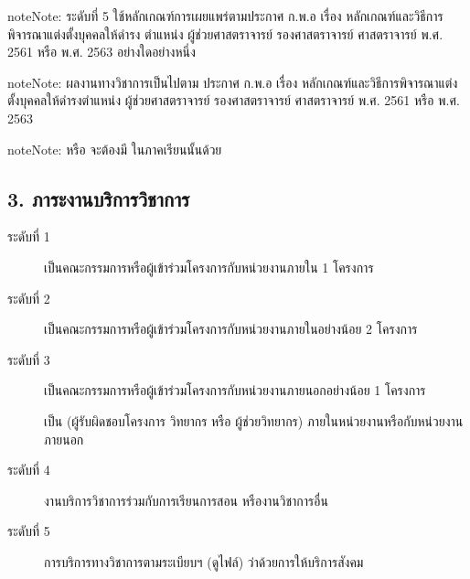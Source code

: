 \documentclass[a4paper,12pt,english]{sphinxmanual}
\begin{document}
\begin{sphinxadmonition}{note}{Note:}
ระดับที่ 5 ใช้หลักเกณฑ์การเผยแพร่ตามประกาศ ก.พ.อ เรื่อง หลักเกณฑ์และวิธีการพิจารณาแต่งตั้งบุคคลให้ดำรง ตำแหน่ง ผู้ช่วยศาสตราจารย์
รองศาสตราจารย์ ศาสตราจารย์ พ.ศ. 2561 หรือ พ.ศ. 2563 อย่างใดอย่างหนึ่ง
\end{sphinxadmonition}

\begin{sphinxadmonition}{note}{Note:}
ผลงานทางวิชาการเป็นไปตาม ประกาศ ก.พ.อ เรื่อง หลักเกณฑ์และวิธีการพิจารณาแต่งตั้งบุคคลให้ดำรงตำแหน่ง ผู้ช่วยศาสตราจารย์ รองศาสตราจารย์ ศาสตราจารย์ พ.ศ. 2561 หรือ พ.ศ. 2563
\end{sphinxadmonition}

\begin{sphinxadmonition}{note}{Note:}
{\hyperref[\detokenize{glossary:term-0}]{}} หรือ {\hyperref[\detokenize{glossary:term-1}]{}} จะต้องมี {\hyperref[\detokenize{glossary:term-7}]{}} ในภาคเรียนนั้นด้วย
\end{sphinxadmonition}


\subsection{3. ภาระงานบริการวิชาการ}
\label{\detokenize{submission_part1:id15}}\begin{description}
\item[{ระดับที่ 1}] \leavevmode
เป็นคณะกรรมการหรือผู้เข้าร่วมโครงการกับหน่วยงานภายใน 1 โครงการ

\item[{ระดับที่ 2}] \leavevmode
เป็นคณะกรรมการหรือผู้เข้าร่วมโครงการกับหน่วยงานภายในอย่างน้อย 2 โครงการ

\item[{ระดับที่ 3}] \leavevmode
เป็นคณะกรรมการหรือผู้เข้าร่วมโครงการกับหน่วยงานภายนอกอย่างน้อย 1 โครงการ

 เป็น {\hyperref[\detokenize{glossary:term-5}]{}} (ผู้รับผิดชอบโครงการ วิทยากร หรือ ผู้ช่วยวิทยากร) ภายในหน่วยงานหรือกับหน่วยงานภายนอก

\item[{ระดับที่ 4}] \leavevmode
{\hyperref[\detokenize{glossary:term-11}]{}} งานบริการวิชาการร่วมกับการเรียนการสอน หรืองานวิชาการอื่น

\end{description}
\begin{description}
\item[{ระดับที่ 5}] \leavevmode
การบริการทางวิชาการตามระเบียบฯ (ดูไฟล์) ว่าด้วยการให้บริการสังคม

\end{description}
\end{document}
